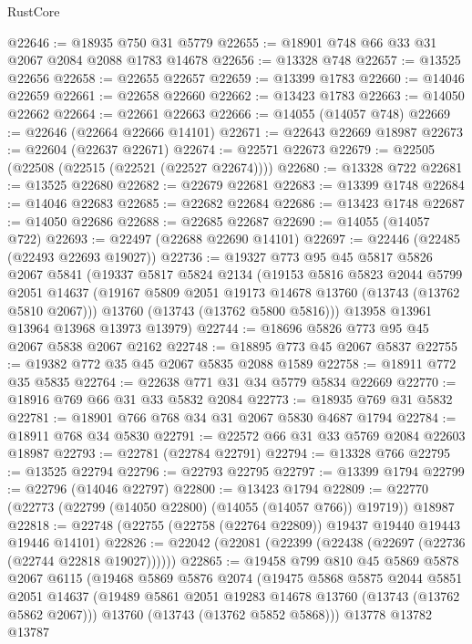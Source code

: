 \begin{lexlean}{RustCore}
\begin{coremodule}
@22646 := @18935 @750 @31 @5779
@22655 := @18901 @748 @66 @33 @31 @2067 @2084 @2088 @1783 @14678
@22656 := @13328 @748
@22657 := @13525 @22656
@22658 := @22655 @22657
@22659 := @13399 @1783
@22660 := @14046 @22659
@22661 := @22658 @22660
@22662 := @13423 @1783
@22663 := @14050 @22662
@22664 := @22661 @22663
@22666 := @14055 (@14057 @748)
@22669 := @22646 (@22664 @22666 @14101)
@22671 := @22643 @22669 @18987
@22673 := @22604 (@22637 @22671)
@22674 := @22571 @22673
@22679 := @22505 (@22508 (@22515 (@22521 (@22527 @22674))))
@22680 := @13328 @722
@22681 := @13525 @22680
@22682 := @22679 @22681
@22683 := @13399 @1748
@22684 := @14046 @22683
@22685 := @22682 @22684
@22686 := @13423 @1748
@22687 := @14050 @22686
@22688 := @22685 @22687
@22690 := @14055 (@14057 @722)
@22693 := @22497 (@22688 @22690 @14101)
@22697 := @22446 (@22485 (@22493 @22693 @19027))
@22736 := @19327
    @773
    @95
    @45
    @5817
    @5826
    @2067
    @5841
    (@19337
      @5817
      @5824
      @2134
      (@19153
        @5816
        @5823
        @2044
        @5799
        @2051
        @14637
        (@19167 @5809 @2051 @19173 @14678 @13760 (@13743 (@13762 @5810 @2067)))
        @13760
        (@13743 (@13762 @5800 @5816)))
      @13958
      @13961
      @13964
      @13968
      @13973
      @13979)
@22744 := @18696 @5826 @773 @95 @45 @2067 @5838 @2067 @2162
@22748 := @18895 @773 @45 @2067 @5837
@22755 := @19382 @772 @35 @45 @2067 @5835 @2088 @1589
@22758 := @18911 @772 @35 @5835
@22764 := @22638 @771 @31 @34 @5779 @5834 @22669
@22770 := @18916 @769 @66 @31 @33 @5832 @2084
@22773 := @18935 @769 @31 @5832
@22781 := @18901 @766 @768 @34 @31 @2067 @5830 @4687 @1794
@22784 := @18911 @768 @34 @5830
@22791 := @22572 @66 @31 @33 @5769 @2084 @22603 @18987
@22793 := @22781 (@22784 @22791)
@22794 := @13328 @766
@22795 := @13525 @22794
@22796 := @22793 @22795
@22797 := @13399 @1794
@22799 := @22796 (@14046 @22797)
@22800 := @13423 @1794
@22809 := @22770 (@22773 (@22799 (@14050 @22800) (@14055 (@14057 @766)) @19719)) @18987
@22818 := @22748 (@22755 (@22758 (@22764 @22809)) @19437 @19440 @19443 @19446 @14101)
@22826 := @22042 (@22081 (@22399 (@22438 (@22697 (@22736 (@22744 @22818 @19027))))))
@22865 := @19458
    @799
    @810
    @45
    @5869
    @5878
    @2067
    @6115
    (@19468
      @5869
      @5876
      @2074
      (@19475
        @5868
        @5875
        @2044
        @5851
        @2051
        @14637
        (@19489 @5861 @2051 @19283 @14678 @13760 (@13743 (@13762 @5862 @2067)))
        @13760
        (@13743 (@13762 @5852 @5868)))
      @13778
      @13782
      @13787

\end{coremodule}
\end{lexlean}

